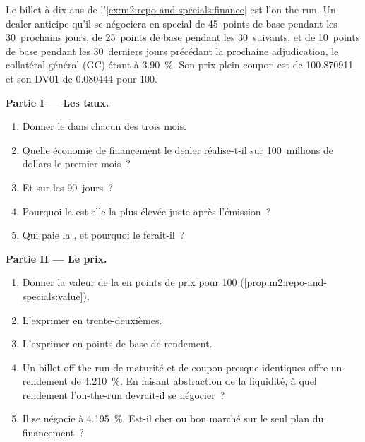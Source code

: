 \begin{problem}\label{pb:m2:repo-and-specials:1}
Le billet à dix ans de l'\cref{ex:m2:repo-and-specials:finance} est l'on-the-run.
Un dealer anticipe qu'il se négociera en special de 45~points de base pendant les 30~prochains jours,
de 25~points de base pendant les 30~suivants, et de 10~points de base pendant les 30~derniers jours
précédant la prochaine adjudication, le collatéral général (GC) étant à 3.90~\%. Son prix plein
coupon est de 100.870911 et son DV01 de 0.080444 pour 100.

\medskip\noindent\textbf{Partie I --- Les taux.}
\begin{enumerate}
\item Donner le  dans chacun des trois mois.
\item Quelle économie de financement le dealer réalise-t-il sur 100~millions de dollars le premier
mois~?
\item Et sur les 90~jours~?
\item Pourquoi la  est-elle la plus élevée juste après l'émission~?
\item Qui paie la , et pourquoi le ferait-il~?
\end{enumerate}

\medskip\noindent\textbf{Partie II --- Le prix.}
\begin{enumerate}[resume]
\item Donner la valeur de la  en points de prix pour 100
(\cref{prop:m2:repo-and-specials:value}).
\item L'exprimer en trente-deuxièmes.
\item L'exprimer en points de base de rendement.
\item Un billet off-the-run de maturité et de coupon presque identiques offre un rendement de 4.210~\%.
En faisant abstraction de la liquidité, à quel rendement l'on-the-run devrait-il se négocier~?
\item Il se négocie à 4.195~\%. Est-il cher ou bon marché sur le seul plan du financement~?
\end{enumerate}


\end{problem}
